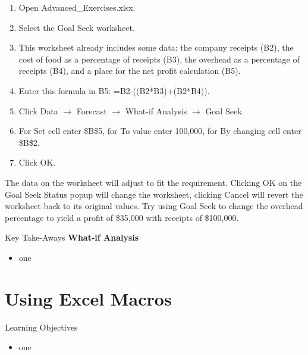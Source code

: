 \begin{enumerate}
	\item Open Advanced\_Exercises.xlsx.
	\item Select the Goal Seek worksheet.
	\item This worksheet already includes some data: the company receipts (B2), the cost of food as a percentage of receipts (B3), the overhead as a percentage of receipts (B4), and a place for the net profit calculation (B5).
	\item Enter this formula in B5: =B2-((B2*B3)+(B2*B4)).
	\item Click Data $\rightarrow$ Forecast $\rightarrow$ What-if Analysis $\rightarrow$ Goal Seek.
	\item For Set cell enter \$B\$5, for To value enter 100,000, for By changing cell enter \$B\$2.
	\item Click OK.
\end{enumerate}

The data on the worksheet will adjust to fit the requirement. Clicking OK on the Goal Seek Status popup will change the worksheet, clicking Cancel will revert the worksheet back to its original values.
Try using Goal Seek to change the overhead percentage to yield a profit of \$35,000 with receipts of \$100,000. 

\begin{center}
	\begin{tkwbox}{Key Take-Aways}
		\textbf{What-if Analysis}
		\\
		\begin{itemize}
			\setlength{\itemsep}{0pt}
			\setlength{\parskip}{0pt}
			\setlength{\parsep}{0pt}
			
			\item one
			
		\end{itemize}
	\end{tkwbox}
\end{center}

\section{Using Excel Macros}

\begin{center}
	\begin{objbox}{Learning Objectives}
		\begin{itemize}
			\setlength{\itemsep}{0pt}
			\setlength{\parskip}{0pt}
			\setlength{\parsep}{0pt}
			
			\item one
			
		\end{itemize}
	\end{objbox}
\end{center}

